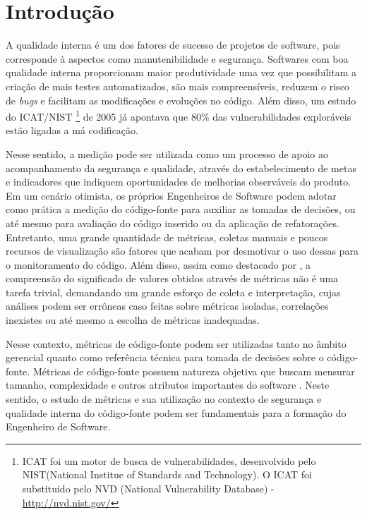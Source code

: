 \section{Introdução}
\label{introduction}

A qualidade interna é um dos fatores de sucesso de projetos de software, pois corresponde à aspectos como manutenibilidade e segurança. Softwares com boa qualidade interna proporcionam maior produtividade uma vez que possibilitam a criação de mais testes automatizados, são mais compreensíveis, reduzem o risco de \emph{bugs} e facilitam as modificações e evoluções no código.
%
Além disso, um estudo do ICAT/NIST
%
\footnote{ICAT foi um motor de busca de vulnerabilidades, desenvolvido pelo NIST(National Institue of Standards and Technology). O ICAT foi substituido pelo NVD (National Vulnerability Database) - \url{http://nvd.nist.gov/}}
%
de 2005 já apontava que 80\% das vulnerabilidades exploráveis estão ligadas a má codificação.

Nesse sentido, a medição pode ser utilizada como um processo de apoio ao acompanhamento da segurança e qualidade, através do estabelecimento de metas e indicadores que indiquem oportunidades de melhorias observáveis do produto. Em um cenário otimista,
os próprios Engenheiros de Software podem adotar como prática a medição do código-fonte para auxiliar as tomadas de decisões, ou até mesmo para avaliação do código inserido ou da aplicação de refatorações. Entretanto, uma grande quantidade de métricas, coletas manuais e poucos recursos de visualização são fatores que acabam por desmotivar o uso dessas para o monitoramento do código. Além disso, assim como destacado por \cite{chidamber1994}, a compreensão do significado de valores obtidos através de métricas não é uma tarefa trivial, demandando um grande esforço de coleta e interpretação, cujas análises podem ser errôneas caso feitas sobre métricas isoladas, correlações inexistes ou até mesmo a escolha de métricas inadequadas.

Nesse contexto, métricas de código-fonte podem ser utilizadas tanto no âmbito gerencial quanto como referência técnica para tomada de decisões sobre o código-fonte. Métricas de código-fonte possuem natureza objetiva que buscam mensurar tamanho, complexidade e outros atributos importantes do software \cite{henry1984kafura}\cite{yau1985zweben}\cite{systa2000}. Neste sentido, o estudo de métricas e sua utilização no contexto de segurança e qualidade interna do código-fonte podem ser fundamentais para a formação do Engenheiro de Software.

